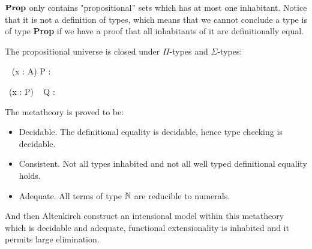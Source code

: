 




 $\operatorname{\mathbf{Prop}}$ only contains "propositional'' sets which has at most one
inhabitant. Notice that it is not a definition of types, which means
that we cannot conclude a type is of type \textbf{Prop} if we have a
proof that all inhabitants of it are definitionally equal.

The propositional universe is closed under $\Pi$-types and $\Sigma$-types:



{\Gamma \vdash \Pi~ (x : A) \to P : \Prop}



{\Gamma \vdash \Sigma ~(x : P) ~ Q : \Prop}


The metatheory is proved {\cite{alti:lics99}} to be:

\begin{itemize}
\item Decidable. The definitional equality is decidable, hence type checking is decidable.

\item Consistent. Not all types inhabited and not all well typed definitional equality holds. 

\item Adequate. All terms of type $\mathbb{N}$ are reducible to numerals.
\end{itemize}


And then Altenkirch construct an intensional model within this metatheory which is decidable and adequate, functional extensionality is inhabited and it permits large elimination. 





